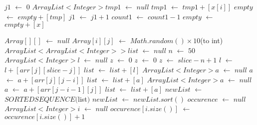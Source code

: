 \documentclass[twocolumn]{article}      %
\begin{document}
\begin{algorithm}
  \begin{algorithmic}
\State $j1$ $\gets$ $0$
\State $ArrayList<Integer>tmp1$ $\gets$ $null$
\State $tmp1$ $\gets$ $tmp1+[x[i]] $
\EndFor
\State $empty$ $\gets$ $empty+[tmp]$
\State $j1$ $\gets$ $j1+1$
\State $count1$ $\gets$ $count1-1$
\EndWhile
\EndFor
\EndIf
{}
\State $empty$ $\gets$ $empty+[x]$
\EndIf
\EndProcedure
\end{algorithmic}
\end{algorithm}
\newpage
\begin{algorithm}
\begin{algorithmic}[1]
\State $Array[][]$ $\gets$ $null$
\State $Array[i][j]$ $\gets$ $Math.random()\times10$(to int)
\EndFor
\EndFor
\State $ArrayList<ArrayList<Integer>>list$ $\gets$ $null$
\State $n$ $\gets$ $50$
\State $ArrayList<Integer>l$ $\gets$ $null$
\State $z$ $\gets$ $0$
\State $z$ $\gets$ $0$
\EndIf
{}
\State $z$ $\gets$ $slice-n+1$ 
\State $l$ $\gets$ $l+[arr[j][slice-j]]$
\EndFor
\State $list$ $\gets$ $list+[l]$
\EndFor
{}
\State $ArrayList<Integer>a$ $\gets$ $null$
\State $a$ $\gets$ $a+[arr[j][j-i]]$
\EndFor
\State $list$ $\gets$ $list+[a]$
\EndFor
{}
\State $ArrayList<Integer>a$ $\gets$ $null$
\State $a$ $\gets$ $a+[arr[j-i-1][j]]$
\EndFor
\State $list$ $\gets$ $list+[a]$
\EndFor
\State $newList$ $\gets$ $SORTEDSEQUENCE($list$)$
\State $newList$ $\gets$ $newList.sort()$
\State $occurence$ $\gets$ $null$
\State $ArrayList<Integer>i$ $\gets$ $null$
\State $occurence[i.size()]$ $\gets$ $occurence[i.size()]+1$
\EndFor
\end{algorithmic}
\end{algorithm}
\newpage
\end{document}
